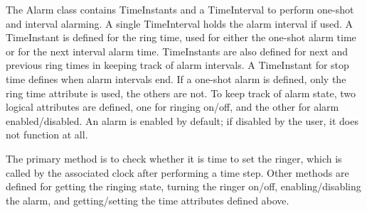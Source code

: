 
The Alarm class contains TimeInstants and a TimeInterval to perform one-shot
and interval alarming.  A single TimeInterval holds the alarm interval if
used.  A TimeInstant is defined for the ring time, used for either the one-shot
alarm time or for the next interval alarm time.  TimeInstants are also
defined for next and previous ring times in keeping track of alarm intervals.
A TimeInstant for stop time defines when alarm intervals end.  If a one-shot
alarm is defined, only the ring time attribute is used, the others are not.
To keep track of alarm state, two logical attributes are defined, one for
ringing on/off, and the other for alarm enabled/disabled.  An alarm is 
enabled by default; if disabled by the user, it does not function at all.

The primary method is to check whether it is time to set the ringer, which
is called by the associated clock after performing a time step.  Other methods
are defined for getting the ringing state, turning the ringer on/off,
enabling/disabling the alarm, and getting/setting the time attributes
defined above.
